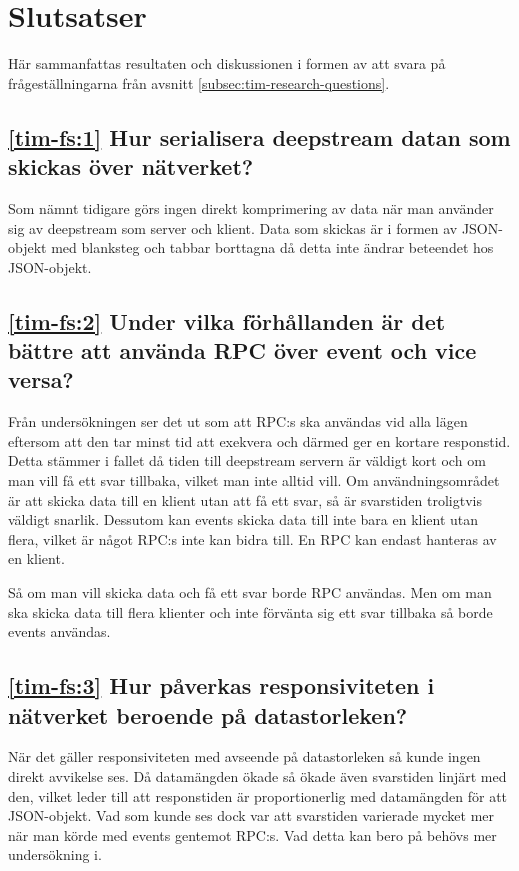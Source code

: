 \section{Slutsatser}
\label{sec:tim-conclusion}
Här sammanfattas resultaten och diskussionen i formen av att svara på frågeställningarna från avsnitt \ref{subsec:tim-research-questions}.

\subsection*{\ref{tim-fs:1} Hur serialisera deepstream datan som skickas över nätverket?}
Som nämnt tidigare görs ingen direkt komprimering av data när man använder sig av deepstream som server och klient. Data som skickas är i formen av JSON-objekt med blanksteg och tabbar borttagna då detta inte ändrar beteendet hos JSON-objekt.

\subsection*{\ref{tim-fs:2} Under vilka förhållanden är det bättre att använda RPC över event och vice versa?}
Från undersökningen ser det ut som att RPC:s ska användas vid alla lägen eftersom att den tar minst tid att exekvera och därmed ger en kortare responstid. Detta stämmer i fallet då tiden till deepstream servern är väldigt kort och om man vill få ett svar tillbaka, vilket man inte alltid vill. Om användningsområdet är att skicka data till en klient utan att få ett svar, så är svarstiden troligtvis väldigt snarlik. Dessutom kan events skicka data till inte bara en klient utan flera, vilket är något RPC:s inte kan bidra till. En RPC kan endast hanteras av en klient.

Så om man vill skicka data och få ett svar borde RPC användas. Men om man ska skicka data till flera klienter och inte förvänta sig ett svar tillbaka så borde events användas.

\subsection*{\ref{tim-fs:3} Hur påverkas responsiviteten i nätverket beroende på datastorleken?}
När det gäller responsiviteten med avseende på datastorleken så kunde ingen direkt avvikelse ses. Då datamängden ökade så ökade även svarstiden linjärt med den, vilket leder till att responstiden är proportionerlig med datamängden för att JSON-objekt. Vad som kunde ses dock var att svarstiden varierade mycket mer när man körde med events gentemot RPC:s. Vad detta kan bero på behövs mer undersökning i.
